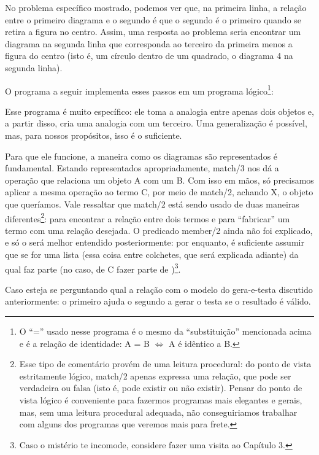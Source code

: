\documentclass{article}
\begin{document}
No problema específico mostrado, podemos ver que, na primeira linha, a relação entre o primeiro diagrama e o segundo é que o segundo é o primeiro quando se retira a figura no centro. Assim, uma resposta ao problema seria encontrar um diagrama na segunda linha que corresponda ao terceiro da primeira menos a figura do centro (isto é, um círculo dentro de um quadrado, o diagrama 4 na segunda linha).

O programa a seguir implementa esses passos em um programa lógico\footnote{O ``='' usado nesse programa é o mesmo da ``substituição'' mencionada acima e é a relação de identidade: A = B $\Leftrightarrow$ A é idêntico a B.}:



Esse programa é muito específico: ele toma a analogia entre apenas dois objetos e, a partir disso, cria uma analogia com um terceiro. Uma generalização é possível, mas, para nossos propósitos, isso é o suficiente.

Para que ele funcione, a maneira como os diagramas são representados é fundamental. Estando representados apropriadamente, match/3 nos dá a operação que relaciona um objeto A com um B. Com isso em mãos, só precisamos aplicar a mesma operação ao termo C, por meio de match/2, achando X, o objeto que queríamos. Vale ressaltar que match/2 está sendo usado de duas maneiras diferentes\footnote{Esse tipo de comentário provém de uma leitura procedural: do ponto de
  vista estritamente lógico, match/2 apenas expressa uma relação, que pode ser verdadeira ou falsa (isto é, pode existir ou não existir). Pensar do ponto de vista lógico é conveniente para fazermos programas mais elegantes e gerais, mas, sem uma leitura procedural adequada, não conseguiriamos trabalhar com alguns dos programas que veremos mais para frete.}: para encontrar a relação entre dois termos e para ``fabricar'' um termo com uma relação
desejada. O predicado member/2 ainda não foi explicado, e só o será melhor entendido posteriormente: por enquanto, é suficiente assumir que  se  for uma lista (essa coisa entre colchetes, que será explicada adiante) da qual  faz parte (no caso, de C fazer parte de )\footnote{Caso o mistério te incomode, considere fazer uma visita ao Capítulo 3.}.

Caso esteja se perguntando qual a relação com o modelo do gera-e-testa discutido anteriormente: o primeiro  ajuda o segundo a gerar o  testa se o resultado é válido.
\end{document}
